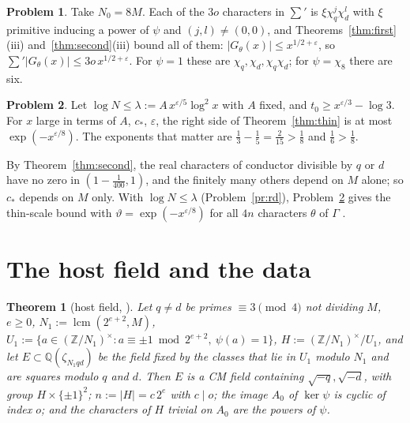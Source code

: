 \documentclass[reqno]{amsart}
\theoremstyle{definition}
\newtheorem{problem}{Problem}[section]
\theoremstyle{plain}
\newtheorem{theorem}{Theorem}[section]
\newcommand{\Z}{\mathbb{Z}}
\newcommand{\Q}{\mathbb{Q}}
\begin{document}
\begin{problem}\label{pr:twists}
Take \(N_0 = 8M\).  Each of the \(3o\) characters in \(\sum'\) is \(\xi\chi_q^j\chi_d^l\) with \(\xi\) primitive inducing a power of \(\psi\) and \((j,l) \ne (0,0)\), and Theorems~\ref{thm:first}(iii) and~\ref{thm:second}(iii) bound all of them: \(\lvert G_\theta(x)\rvert \le x^{1/2+\varepsilon}\), so \(\sum'\lvert G_\theta(x)\rvert \le 3o\,x^{1/2+\varepsilon}\).  For \(\psi = 1\) these are \(\chi_q, \chi_d, \chi_q\chi_d\); for \(\psi = \chi_8\) there are six.
\end{problem}

\begin{problem}\label{pr:thin}
Let \(\log N \le \lambda := A\,x^{\varepsilon/5}\log^2x\) with \(A\) fixed, and \(t_0 \ge x^{\varepsilon/3} - \log 3\).  For \(x\) large in terms of \(A\), \(c_\ast\), \(\varepsilon\), the right side of Theorem~\ref{thm:thin} is at most \(\exp(-x^{\varepsilon/8})\).  The exponents that matter are \(\frac13 - \frac15 = \frac{2}{15} > \frac18\) and \(\frac16 > \frac18\).
\end{problem}

By Theorem~\ref{thm:second}, the real characters of conductor divisible by \(q\) or \(d\) have no zero in \((1 - \frac1{400}, 1)\), and the finitely many others depend on \(M\) alone; so \(c_\ast\) depends on \(M\) only.  With \(\log N \le \lambda\) (Problem~\ref{pr:rd}), Problem~\ref{pr:thin} gives the thin-scale bound with \(\vartheta = \exp(-x^{\varepsilon/8})\) for all \(4n\) characters \(\theta\) of \(\Gamma\) \cite[proof of Thm.~6.3]{Adr}.

\section{The host field and the data}\label{sec:data}

\begin{theorem}[host field, {\cite[Prop.~5.14]{Adr}}]\label{thm:field}
Let \(q \ne d\) be primes \(\equiv 3 \pmod 4\) not dividing \(M\), \(e \ge 0\), \(N_1 := \operatorname{lcm}(2^{e+2}, M)\), \(U_1 := \{a \in (\Z/N_1)^\times : a \equiv \pm1 \bmod 2^{e+2},\ \psi(a) = 1\}\), \(H := (\Z/N_1)^\times/U_1\), and let \(E \subset \Q(\zeta_{N_1qd})\) be the field fixed by the classes that lie in \(U_1\) modulo \(N_1\) and are squares modulo \(q\) and \(d\).  Then \(E\) is a CM field containing \(\sqrt{-q}, \sqrt{-d}\), with group \(H \times \{\pm1\}^2\); \(n := \lvert H\rvert = c\,2^e\) with \(c \mid o\); the image \(A_0\) of \(\ker\psi\) is cyclic of index \(o\); and the characters of \(H\) trivial on \(A_0\) are the powers of \(\psi\).
\end{theorem}
\end{document}

